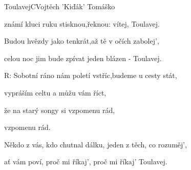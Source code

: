 \begin{song}{Toulavej}{C}{Vojtěch 'Kiďák' Tomáško}
\begin{SBVerse}
známí kluci ruku stisknou,řeknou: vítej, Toulavej.

\end{SBVerse}

\begin{SBVerse}

Budou hvězdy jako tenkrát,až tě v očích zabolej',

celou noc jim bude zpívat jeden blázen - Toulavej.

\end{SBVerse}

\begin{SBChorus}

R: Sobotní ráno nám poletí vstříc,budeme u cesty stát,

vypráším celtu a můžu vám říct,

že na starý songy si vzpomenu rád,

vzpomenu rád.

\end{SBChorus}

\begin{SBVerse}

Někdo z vás, kdo chutnal dálku, jeden z těch, co rozuměj',

ať vám poví, proč mi říkaj', proč mi říkaj' Toulavej.

\end{SBVerse}

\end{song}

\clearpage
